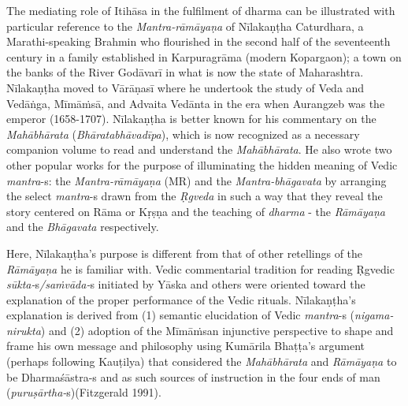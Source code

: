 The mediating role of Itihāsa in the fulfilment of dharma can be illustrated with particular reference to the \textit{Mantra-rāmāyaṇa} of Nīlakaṇṭha Caturdhara, a Marathi-speaking Brahmin who flourished in the second half of the seventeenth century in a family established in Karpuragrāma (modern Kopargaon); a town on the banks of the River Godāvarī in what is now the state of Maharashtra. Nīlakaṇṭha moved to Vārāṇasī where he undertook the study of Veda and Vedāṅga, Mīmāṁsā, and Advaita Vedānta in the era when Aurangzeb was the emperor (1658-1707). Nīlakaṇṭha is better known for his commentary on the \textit{Mahābhārata} (\textit{Bhāratabhāvadīpa}), which is now recognized as a necessary companion volume to read and understand the \textit{Mahābhārata}. He also wrote two other popular works for the purpose of illuminating the hidden meaning of Vedic \textit{mantra}-s: the \textit{Mantra-rāmāyaṇa} (MR) and the \textit{Mantra-bhāgavata} by arranging the select \textit{mantra}-s drawn from the \textit{Ṛgveda} in such a way that they reveal the story centered on Rāma or Kṛṣṇa and the teaching of \textit{dharma} - the \textit{Rāmāyaṇa} and the \textit{Bhāgavata} respectively.

Here, Nīlakaṇṭha’s purpose is different from that of other retellings of the \textit{Rāmāyaṇa} he is familiar with. Vedic commentarial tradition for reading Ṛgvedic \textit{sūkta-}s\textit{/saṁvāda-}s initiated by Yāska and others were oriented toward the explanation of the proper performance of the Vedic rituals. Nīlakaṇṭha's explanation is derived from (1) semantic elucidation of Vedic \textit{mantra}-s (\textit{nigama-nirukta}) and (2) adoption of the Mīmāṁsan injunctive perspective to shape and frame his own message and philosophy using Kumārila Bhaṭṭa’s argument (perhaps following Kauṭilya) that considered the \textit{Mahābhārata} and \textit{Rāmāyaṇa} to be Dharmaśāstra-s and as such sources of instruction in the four ends of man (\textit{puruṣārtha-}s)(Fitzgerald 1991).

